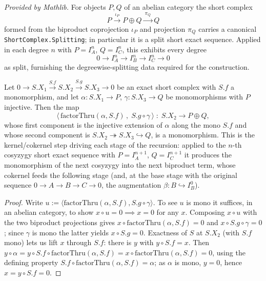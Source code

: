\begin{lemma}
  \label{lem:horseshoe_degree_split}
  \mathlibok
  \textit{Provided by Mathlib.}
  For objects \(P, Q\) of an abelian category the short complex
  \[
    P \xrightarrow{\ \iota_P\ } P \oplus Q \xrightarrow{\ \pi_Q\ } Q
  \]
  formed from the biproduct coprojection \(\iota_P\) and projection \(\pi_Q\) carries a
  canonical \texttt{ShortComplex.Splitting}; in particular it is a split short exact
  sequence. Applied in each degree \(n\) with \(P = I_A^n\), \(Q = I_C^n\), this exhibits
  every degree
  \[
    0 \longrightarrow I_A^n \longrightarrow I_B^n \longrightarrow I_C^n \longrightarrow 0
  \]
  as split, furnishing the degreewise-splitting data required for the construction.
\end{lemma}

\begin{lemma}
  \label{lem:horseshoe_stage_mono}
  Let \(0 \to S.X_1 \xrightarrow{S.f} S.X_2 \xrightarrow{S.g} S.X_3 \to 0\) be an exact
  short complex with \(S.f\) a monomorphism, and let \(\alpha : S.X_1 \to P\),
  \(\gamma : S.X_3 \to Q\) be monomorphisms with \(P\) injective. Then the map
  \[
    \bigl\langle\, \mathrm{factorThru}(\alpha, S.f)\,,\; S.g \circ \gamma \,\bigr\rangle
      \;:\; S.X_2 \longrightarrow P \oplus Q,
  \]
  whose first component is the injective extension of \(\alpha\) along the mono \(S.f\)
  and whose second component is \(S.X_2 \twoheadrightarrow S.X_3 \hookrightarrow Q\), is a
  monomorphism. This is the kernel/cokernel step driving each stage of the recursion:
  applied to the \(n\)-th cosyzygy short exact sequence with \(P = I_A^{n+1}\),
  \(Q = I_C^{n+1}\) it produces the monomorphism of the next cosyzygy into the next
  biproduct term, whose cokernel feeds the following stage (and, at the base stage with
  the original sequence \(0 \to A \to B \to C \to 0\), the augmentation
  \(\beta : B \hookrightarrow I_B^0\)).
\end{lemma}

\begin{proof}
  \leanok
  Write \(u := \langle \mathrm{factorThru}(\alpha, S.f), S.g \circ \gamma\rangle\). To see
  \(u\) is mono it suffices, in an abelian category, to show \(x \circ u = 0 \implies x = 0\)
  for any \(x\). Composing \(x \circ u\) with the two biproduct projections gives
  \(x \circ \mathrm{factorThru}(\alpha, S.f) = 0\) and \(x \circ S.g \circ \gamma = 0\);
  since \(\gamma\) is mono the latter yields \(x \circ S.g = 0\). Exactness of \(S\) at
  \(S.X_2\) (with \(S.f\) mono) lets us lift \(x\) through \(S.f\): there is \(y\) with
  \(y \circ S.f = x\). Then \(y \circ \alpha = y \circ S.f \circ \mathrm{factorThru}(\alpha, S.f)
  = x \circ \mathrm{factorThru}(\alpha, S.f) = 0\), using the defining property
  \(S.f \circ \mathrm{factorThru}(\alpha, S.f) = \alpha\); as \(\alpha\) is mono, \(y = 0\),
  hence \(x = y \circ S.f = 0\).
\end{proof}


